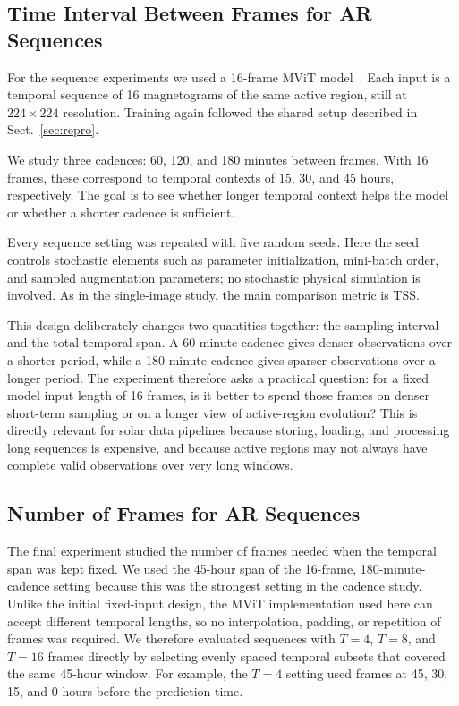 \subsection{Time Interval Between Frames for AR Sequences}

For the sequence experiments we used a 16-frame MViT model~\cite{ref_mvit}. Each input is a temporal sequence of 16 magnetograms of the same active region, still at $224 \times 224$ resolution. Training again followed the shared setup described in Sect.~\ref{sec:repro}.

We study three cadences: 60, 120, and 180 minutes between frames. With 16 frames, these correspond to temporal contexts of 15, 30, and 45 hours, respectively. The goal is to see whether longer temporal context helps the model or whether a shorter cadence is sufficient.

Every sequence setting was repeated with five random seeds. Here the seed controls stochastic elements such as parameter initialization, mini-batch order, and sampled augmentation parameters; no stochastic physical simulation is involved. As in the single-image study, the main comparison metric is TSS.

This design deliberately changes two quantities together: the sampling interval and the total temporal span. A 60-minute cadence gives denser observations over a shorter period, while a 180-minute cadence gives sparser observations over a longer period. The experiment therefore asks a practical question: for a fixed model input length of 16 frames, is it better to spend those frames on denser short-term sampling or on a longer view of active-region evolution? This is directly relevant for solar data pipelines because storing, loading, and processing long sequences is expensive, and because active regions may not always have complete valid observations over very long windows.

\subsection{Number of Frames for AR Sequences}

The final experiment studied the number of frames needed when the temporal span was kept fixed. We used the 45-hour span of the 16-frame, 180-minute-cadence setting because this was the strongest setting in the cadence study. Unlike the initial fixed-input design, the MViT implementation used here can accept different temporal lengths, so no interpolation, padding, or repetition of frames was required. We therefore evaluated sequences with $T=4$, $T=8$, and $T=16$ frames directly by selecting evenly spaced temporal subsets that covered the same 45-hour window. For example, the $T=4$ setting used frames at 45, 30, 15, and 0 hours before the prediction time.

